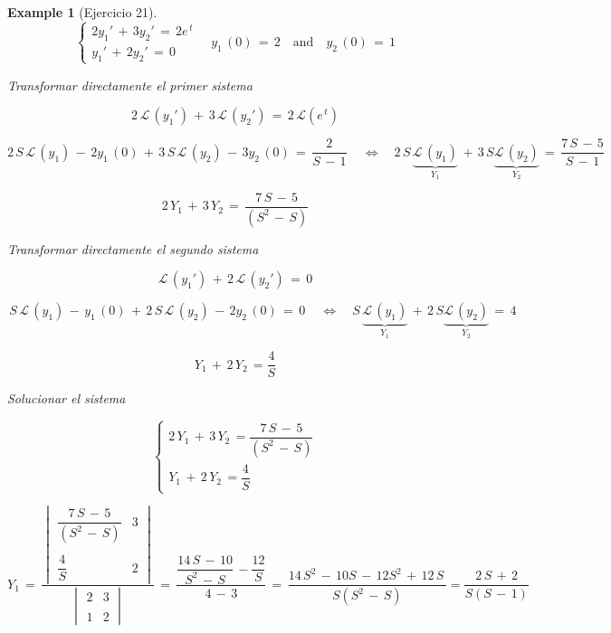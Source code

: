 \documentclass[a4paper,11pt,openany]{book}
\newtheorem{exmp}{Example}[section]
\begin{document}
\begin{exmp}[Ejercicio 21]

$$
\left\{
\begin{array}{lll}
2y_{1}'\,+\,3y_{2}'\,=\,2e^{\,t} \\
y_{1}'\,+\,2y_{2}'\,=\,0
\end{array}
\right.
\quad y_{1}\,(0)\,=\,2 \quad \text{and} \quad y_{2}\,(0)\,=\,1$$

Transformar directamente el primer sistema

$$ 2\,\mathcal{L}\,\left(y_{1}' \right)\,+\,3\,\mathcal{L}\,\left(y_{2}' \right)\,=\,2\,\mathcal{L}\left(e^{\,t}\right)$$

$$2\,S\,\mathcal{L}\,\left(y_{1} \right)\,-\,2y_{1}\,(0)\,+\,3\,S\,\mathcal{L}\,\left(y_{2} \right)\,-\,3y_{2}\,(0)\,=\,\dfrac{2}{S\,-\,1}\,\quad \iff \quad 2\,S\,\underbrace{\mathcal{L}\,\left(y_{1} \right)}_{Y_{1}  }\,+\,3\,S\underbrace{\mathcal{L}\,\left(y_{2} \right)}_{Y_{2 } }\,=\,\dfrac{7\,S\,-\,5}{S\,-\,1} $$

$$\boxed{2\,Y_{1}\,+\,3\,Y_{2}\,=\,\dfrac{7\,S\,-\,5}{ (S^{2}\,-\,S)} }$$

Transformar directamente el segundo sistema

$$\mathcal{L}\,\left(y_{1}' \right)\,+\,2\,\mathcal{L}\,\left(y_{2}' \right)\,=\,0$$

$$\,S\,\mathcal{L}\,\left(y_{1} \right)\,-\,y_{1}\,(0)\,+\,2\,S\,\mathcal{L}\,\left(y_{2} \right)\,-\,2y_{2}\,(0)\,=\,0\,\quad \iff \quad S\,\underbrace{\mathcal{L}\,\left(y_{1} \right)}_{Y_{1}  }\,+\,2\,S\underbrace{\mathcal{L}\,\left(y_{2} \right)}_{Y_{2 } }\,=\,4 $$

$$\boxed{Y_{1}\,+\,2\,Y_{2}\,= \dfrac{4}{S} }$$

Solucionar el sistema

$$\begin{cases}
2\,Y_{1}\,+\,3\,Y_{2}\,=\dfrac{7\,S\,-\,5}{ (S^{2}\,-\,S)}
\\
Y_{1}\,+\,2\,Y_{2}\,= \dfrac{4}{S} 
\end{cases}$$

$$Y_{1}\,=\,\dfrac{\begin{vmatrix}
\dfrac{7\,S\,-\,5}{ (S^{2}\,-\,S)} & 3 \\
\\
\dfrac{4}{S}  & 2
\end{vmatrix} }{\begin{vmatrix}
2 & 3 \\
\\
1 & 2
\end{vmatrix} }\,=\,\dfrac{\dfrac{14\,S\,-\,10}{S^{2}\,-\,S}\,-\dfrac{12}{S} }{4\,-\,3} \,=\,\dfrac{14\,S^{2}\,-\,10S\,-\,12S^{2}\,+\,12\,S\,}{S(S^{2}\,-\,S)} = \dfrac{2\,S\,+\,2}{S(S\,-\,1)}  $$


\end{exmp}
\end{document}
